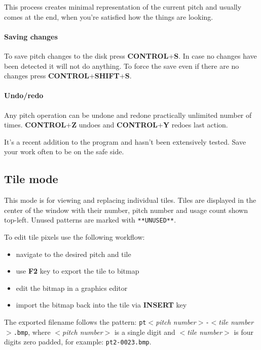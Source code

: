 \documentclass[a4paper,12pt]{article}
\begin{document}
This process creates minimal representation of the current pitch and usually comes at the end, when you're satisfied how the things are looking.

\paragraph{Saving changes}\mbox{}
\vspace{\baselineskip}

To save pitch changes to the disk press {\bf CONTROL}+{\bf S}. In case no changes have been detected it will not do anything. To force the save even if there are no changes press {\bf CONTROL}+{\bf SHIFT}+{\bf S}.

\pagebreak
\paragraph{Undo/redo}\mbox{}
\vspace{\baselineskip}

Any pitch operation can be undone and redone practically unlimited number of times. {\bf CONTROL}+{\bf Z} undoes and {\bf CONTROL}+{\bf Y} redoes last action.

It's a recent addition to the program and hasn't been extensively tested. Save your work often to be on the safe side.

\newpage
\subsection{Tile mode} \label{tileMode}

This mode is for viewing and replacing individual tiles. Tiles are displayed in the center of the window with their number, pitch number and usage count shown top-left. Unused patterns are marked with \verb|**UNUSED**|.

To edit tile pixels use the following workflow:
\begin{itemize}[noitemsep]
\item navigate to the desired pitch and tile
\item use {\bf F2} key to export the tile to bitmap
\item edit the bitmap in a graphics editor
\item import the bitmap back into the tile via {\bf INSERT} key
\end{itemize}

The exported filename follows the pattern: \verb|pt|$<${\it pitch number}$>$\verb|-|$<${\it tile number}$>$\verb|.bmp|, where $<${\it pitch number}$>$ is a single digit and $<${\it tile number}$>$ is four digits zero padded, for example: \verb|pt2-0023.bmp|.
\end{document}
